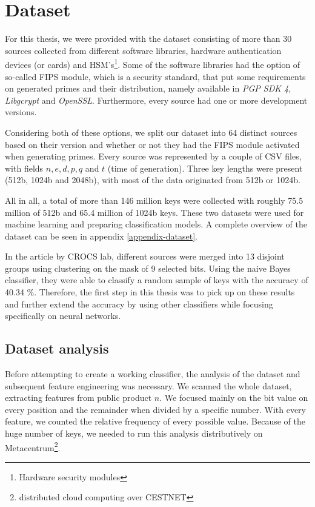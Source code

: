 \chapter{Dataset}

\label{dataset}

For this thesis, we were provided with the dataset consisting of more than 30 sources collected from different software libraries, hardware authentication devices (or cards) and HSM's\footnote{Hardware security modules}. 
Some of the software libraries had the option of so-called FIPS module, which is a security standard, that put some requirements on generated primes and their distribution, namely available in \textit{PGP SDK 4}, \textit{Libgcrypt} and \textit{OpenSSL}. Furthermore, every source had one or more development versions. 

Considering both of these options, we split our dataset into 64 distinct sources based on their version and whether or not they had the FIPS module activated when generating primes. Every source was represented by a couple of CSV files, with fields $n, e, d, p, q$ and $t$ (time of generation). Three key lengths were present (512b, 1024b and 2048b), with most of the data originated from 512b or 1024b.

All in all, a total of more than 146 million keys were collected with roughly 75.5 million of 512b and 65.4 million of 1024b keys. These two datasets were used for machine learning and preparing classification models. A complete overview of the dataset can be seen in appendix \ref{appendix-dataset}.

In the article by CROCS lab\cite{svenda_1}, different sources were merged into 13 disjoint groups using clustering on the mask of 9 selected bits. Using the naive Bayes classifier, they were able to classify a random sample of keys with the accuracy of 40.34 \%. Therefore, the first step in this thesis was to pick up on these results and further extend the accuracy by using other classifiers while focusing specifically on neural networks.

\section{Dataset analysis}

\label{chapter-analysis}

Before attempting to create a working classifier, the analysis of the dataset and subsequent feature engineering was necessary. We scanned the whole dataset, extracting features from public product $n$. We focused mainly on the bit value on every position and the remainder when divided by a specific number. With every feature, we counted the relative frequency of every possible value. Because of the huge number of keys, we needed to run this analysis distributively on Metacentrum\footnote{distributed cloud computing over CESTNET}.


